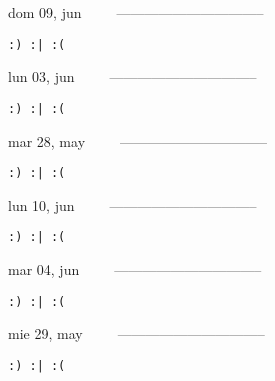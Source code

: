 \documentclass[letterpaper,10pt]{article}
\begin{document}
\begin{multicols}{3}
{dom 09, jun\ \ \ \ \ --------------------------------}
\begin{flushright}\begin{small}\texttt{:) :| :(}\end{small}\end{flushright}
\vfill
{lun 03, jun\ \ \ \ \ --------------------------------}
\begin{flushright}\begin{small}\texttt{:) :| :(}\end{small}\end{flushright}\par
\vfill
{mar 28, may\ \ \ \ \ --------------------------------}
\begin{flushright}\begin{small}\texttt{:) :| :(}\end{small}\end{flushright}\par
\vfill
\end{multicols}
\vspace{1.05cm}

\begin{multicols}{3}
{lun 10, jun\ \ \ \ \ --------------------------------}
\begin{flushright}\begin{small}\texttt{:) :| :(}\end{small}\end{flushright}
\vfill
{mar 04, jun\ \ \ \ \ --------------------------------}
\begin{flushright}\begin{small}\texttt{:) :| :(}\end{small}\end{flushright}\par
\vfill
{mie 29, may\ \ \ \ \ --------------------------------}
\begin{flushright}\begin{small}\texttt{:) :| :(}\end{small}\end{flushright}\par
\vfill
\end{multicols}
\vspace{1.05cm}
\end{document}
